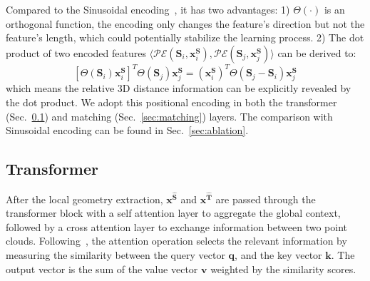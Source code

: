 Compared to the Sinusoidal encoding~\cite{attention_is_all_u_need,carion2020deter}, it has two advantages: 1) $\Theta(\cdot)$ is an orthogonal function, the encoding only changes the feature's direction but not the feature's length, which could potentially stabilize the learning process. 2) The dot product of two encoded features $ \langle \mathcal{PE}(\mathbf{S}_i,  \mathbf{x}^\mathbf{ S}_i), \mathcal{PE}(\mathbf{S}_j,  \mathbf{x}^\mathbf{ S}_j)  \rangle$ can be derived to:
\begin{equation}\label{eqn:relative_position}
[ 
\Theta(\mathbf{S}_i)
\mathbf{x}^\mathbf{ S}_i  
] ^T 
\Theta(\mathbf{S}_j) 
\mathbf{x}^\mathbf{ S}_j 
= (\mathbf{x}^\mathbf{ S}_i)^T \Theta(\mathbf{S}_j-\mathbf{S}_i)  \mathbf{x}^\mathbf{ S}_j
\end{equation}
which means the relative 3D distance information can be explicitly revealed by the dot product.
We adopt this positional encoding in both the transformer (Sec.~\ref{sec:transformer}) and matching (Sec.~\ref{sec:matching}) layers.
The comparison with Sinusoidal encoding can be found in Sec.~\ref{sec:ablation}.





\subsection{Transformer}\label{sec:transformer}

After the local geometry extraction, $\mathbf{x}^\mathbf{\hat{S}}$ and $\mathbf{x}^\mathbf{\hat{T}}$ are passed through the transformer block with a self attention layer to aggregate the global context, followed by a cross attention layer to exchange information between two point clouds.  Following~\cite{attention_is_all_u_need}, the attention operation selects the relevant information by measuring the similarity between the query vector $\mathbf{q}$, and the key vector $\mathbf{k}$. 
The output vector is the sum of the value vector $\mathbf{v}$ weighted by the similarity scores. 

